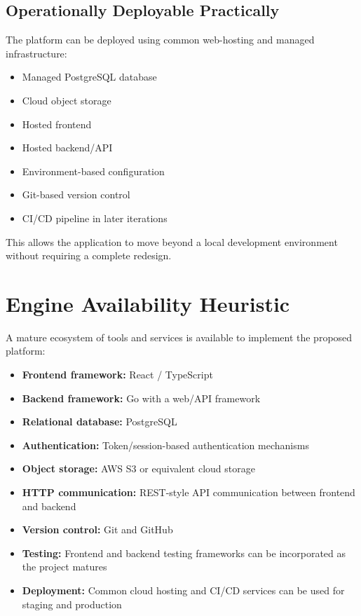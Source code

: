 \documentclass[11pt,a4paper]{article}
\begin{document}
\subsection{Operationally Deployable Practically}
The platform can be deployed using common web-hosting and managed infrastructure:
\begin{itemize}[leftmargin=*]
    \item Managed PostgreSQL database
    \item Cloud object storage
    \item Hosted frontend
    \item Hosted backend/API
    \item Environment-based configuration
    \item Git-based version control
    \item CI/CD pipeline in later iterations
\end{itemize}

This allows the application to move beyond a local development environment without requiring a complete redesign.

\section{Engine Availability Heuristic}
A mature ecosystem of tools and services is available to implement the proposed platform:
\begin{itemize}[leftmargin=*]
    \item \textbf{Frontend framework:} React / TypeScript
    \item \textbf{Backend framework:} Go with a web/API framework
    \item \textbf{Relational database:} PostgreSQL
    \item \textbf{Authentication:} Token/session-based authentication mechanisms
    \item \textbf{Object storage:} AWS S3 or equivalent cloud storage
    \item \textbf{HTTP communication:} REST-style API communication between frontend and backend
    \item \textbf{Version control:} Git and GitHub
    \item \textbf{Testing:} Frontend and backend testing frameworks can be incorporated as the project matures
    \item \textbf{Deployment:} Common cloud hosting and CI/CD services can be used for staging and production
\end{itemize}
\end{document}

